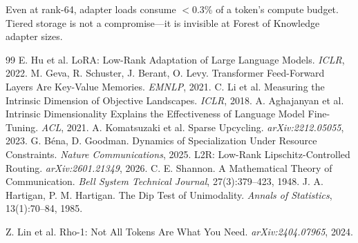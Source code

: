 \documentclass{article}
\newcommand{\tok}{Forest of Knowledge}
\begin{document}
Even at rank-64, adapter loads consume $<$0.3\% of a token's compute budget.
Tiered storage is not a compromise---it is invisible at \tok{} adapter sizes.

\begin{thebibliography}{99}
 E. Hu et al. LoRA: Low-Rank Adaptation of Large Language Models. \textit{ICLR}, 2022.
 M. Geva, R. Schuster, J. Berant, O. Levy. Transformer Feed-Forward Layers Are Key-Value Memories. \textit{EMNLP}, 2021.
 C. Li et al. Measuring the Intrinsic Dimension of Objective Landscapes. \textit{ICLR}, 2018.
 A. Aghajanyan et al. Intrinsic Dimensionality Explains the Effectiveness of Language Model Fine-Tuning. \textit{ACL}, 2021.
 A. Komatsuzaki et al. Sparse Upcycling. \textit{arXiv:2212.05055}, 2023.
 G. B\'{e}na, D. Goodman. Dynamics of Specialization Under Resource Constraints. \textit{Nature Communications}, 2025.
 L2R: Low-Rank Lipschitz-Controlled Routing. \textit{arXiv:2601.21349}, 2026.
 C. E. Shannon. A Mathematical Theory of Communication. \textit{Bell System Technical Journal}, 27(3):379--423, 1948.
 J. A. Hartigan, P. M. Hartigan. The Dip Test of Unimodality. \textit{Annals of Statistics}, 13(1):70--84, 1985.

 Z. Lin et al. Rho-1: Not All Tokens Are What You Need. \textit{arXiv:2404.07965}, 2024.


\end{thebibliography}
\end{document}
